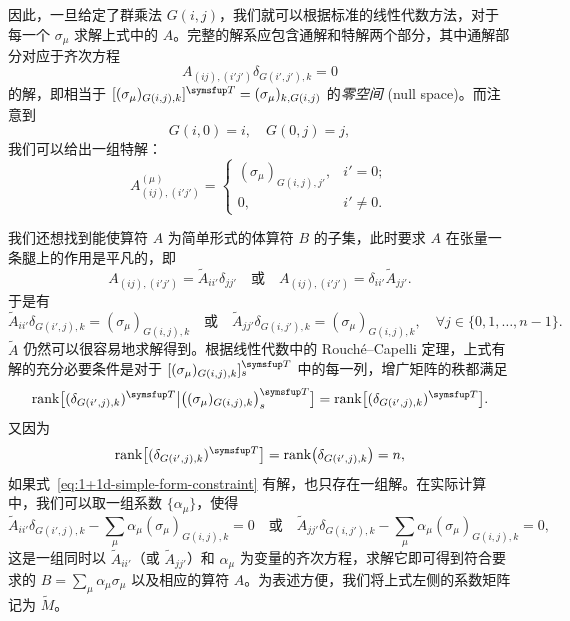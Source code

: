 因此，一旦给定了群乘法 $G(i,j)$，我们就可以根据标准的线性代数方法，对于每一个 $\sigma_\mu$ 求解上式中的 $A$。完整的解系应包含通解和特解两个部分，其中通解部分对应于齐次方程
\begin{equation}
  A_{(ij), (i'j')} \delta_{G(i',j'), k} = 0
\end{equation}
的解，即相当于 $[(\sigma_\mu)_{G(i,j),k}]^\trans=(\sigma_\mu)_{k,G(i,j)}$ 的\emph{零空间} (null space)。而注意到
\begin{equation}
  G(i,0) = i, \quad G(0,j) = j,
\end{equation}
我们可以给出一组特解：
\begin{equation}
  A^{(\mu)}_{(ij), (i'j')} = \begin{cases}
    (\sigma_\mu)_{G(i,j), j'}, & i' = 0; \\
    0, & i' \neq 0.
  \end{cases}
  \label{eq:1+1d-specific-solution}
\end{equation}

我们还想找到能使算符 $A$ 为简单形式的体算符 $B$ 的子集，此时要求 $A$ 在张量一条腿上的作用是平凡的，即
\begin{equation}
  A_{(ij), (i'j')} = \tilde{A}_{ii'} \delta_{jj'} \quad \text{或} \quad
  A_{(ij), (i'j')} = \delta_{ii'} \tilde{A}_{jj'}.
\end{equation}
于是有
\begin{equation}
  \tilde{A}_{ii'} \delta_{G(i',j), k} = (\sigma_\mu)_{G(i,j), k} \quad \text{或} \quad
  \tilde{A}_{jj'} \delta_{G(i,j'), k} = (\sigma_\mu)_{G(i,j), k}, \quad
  \forall j \in \{ 0, 1, \dots, n-1 \}.
  \label{eq:1+1d-simple-form-constraint}
\end{equation}
$\tilde{A}$ 仍然可以很容易地求解得到。根据线性代数中的 Rouch\'e--Capelli 定理，上式有解的充分必要条件是对于 $[(\sigma_\mu)_{G(i,j),k}]^\trans_s$ 中的每一列，增广矩阵的秩都满足
\begin{equation}
    \rank\bigl[ (\delta_{G(i',j), k})^\trans \big| \bigl( (\sigma_\mu)_{G(i,j),k} \bigr)^\trans_s \bigr]
  = \rank\bigl[ (\delta_{G(i',j), k})^\trans \bigr].
\end{equation}
又因为
\begin{equation}
    \rank\bigl[ (\delta_{G(i',j), k})^\trans \bigr]
  = \rank\bigl( \delta_{G(i',j), k} \bigr) = n,
\end{equation}
如果式~\eqref{eq:1+1d-simple-form-constraint} 有解，也只存在一组解。在实际计算中，我们可以取一组系数 $\{\alpha_\mu\}$，使得
\begin{equation}
  \tilde{A}_{ii'} \delta_{G(i',j), k} - \sum_\mu \alpha_\mu (\sigma_\mu)_{G(i,j), k} = 0 \quad \text{或} \quad
  \tilde{A}_{jj'} \delta_{G(i,j'), k} - \sum_\mu \alpha_\mu (\sigma_\mu)_{G(i,j), k} = 0,
  \label{eq:1+1d-simple-form-augmented-constraint}
\end{equation}
这是一组同时以 $\tilde{A}_{ii'}$（或 $\tilde{A}_{jj'}$）和 $\alpha_\mu$ 为变量的齐次方程，求解它即可得到符合要求的 $B=\sum_\mu\alpha_\mu\sigma_\mu$ 以及相应的算符 $A$。为表述方便，我们将上式左侧的系数矩阵记为 $\tilde{M}$。


